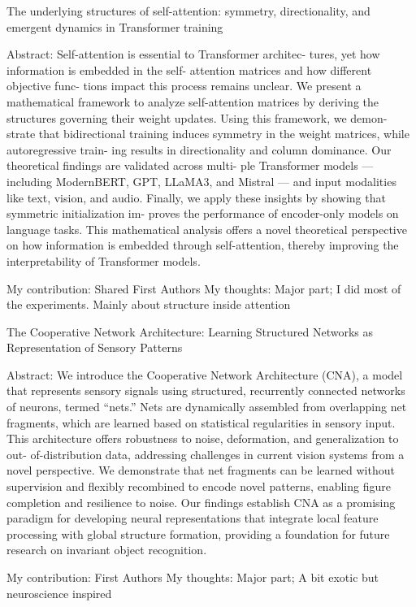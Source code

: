 The underlying structures of self-attention: symmetry, directionality, and emergent dynamics in Transformer training

Abstract: Self-attention is essential to Transformer architec-
tures, yet how information is embedded in the self-
attention matrices and how different objective func-
tions impact this process remains unclear. We present
a mathematical framework to analyze self-attention
matrices by deriving the structures governing their
weight updates. Using this framework, we demon-
strate that bidirectional training induces symmetry
in the weight matrices, while autoregressive train-
ing results in directionality and column dominance.
Our theoretical findings are validated across multi-
ple Transformer models — including ModernBERT,
GPT, LLaMA3, and Mistral — and input modalities
like text, vision, and audio. Finally, we apply these
insights by showing that symmetric initialization im-
proves the performance of encoder-only models on
language tasks. This mathematical analysis offers a
novel theoretical perspective on how information is
embedded through self-attention, thereby improving
the interpretability of Transformer models.

My contribution: Shared First Authors
My thoughts: Major part; I did most of the experiments. Mainly about structure inside attention





The Cooperative Network Architecture: Learning Structured Networks as Representation of Sensory Patterns

Abstract: We introduce the Cooperative Network Architecture (CNA), a model that represents sensory signals
using structured, recurrently connected networks of neurons, termed “nets.” Nets are dynamically
assembled from overlapping net fragments, which are learned based on statistical regularities in
sensory input. This architecture offers robustness to noise, deformation, and generalization to out-
of-distribution data, addressing challenges in current vision systems from a novel perspective. We
demonstrate that net fragments can be learned without supervision and flexibly recombined to encode
novel patterns, enabling figure completion and resilience to noise. Our findings establish CNA as a
promising paradigm for developing neural representations that integrate local feature processing with
global structure formation, providing a foundation for future research on invariant object recognition.

My contribution: First Authors
My thoughts: Major part; A bit exotic but neuroscience inspired



